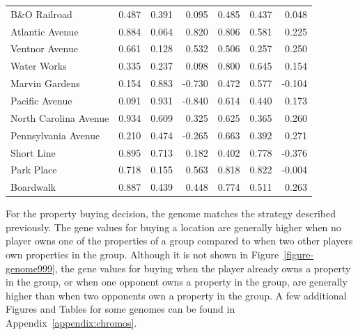 \begin{table}[htbp]
{\begin{tabular}{lrrr|rrr}
    B\&O Railroad & 0.487  & 0.391  & 0.095  & 0.485  & 0.437  & 0.048 \\
    Atlantic Avenue & 0.884  & 0.064  & 0.820  & 0.806  & 0.581  & 0.225 \\
    Ventnor Avenue & 0.661  & 0.128  & 0.532  & 0.506  & 0.257  & 0.250 \\
    Water Works & 0.335  & 0.237  & 0.098  & 0.800  & 0.645  & 0.154 \\
    Marvin Gardens & 0.154  & 0.883  & -0.730 & 0.472  & 0.577  & -0.104 \\
    Pacific Avenue & 0.091  & 0.931  & -0.840 & 0.614  & 0.440  & 0.173 \\
    North Carolina Avenue & 0.934  & 0.609  & 0.325  & 0.625  & 0.365  & 0.260 \\
    Pennsylvania Avenue & 0.210  & 0.474  & -0.265 & 0.663  & 0.392  & 0.271 \\
    Short Line & 0.895  & 0.713  & 0.182  & 0.402  & 0.778  & -0.376 \\
    Park Place & 0.718  & 0.155  & 0.563  & 0.818  & 0.822  & -0.004 \\
    Boardwalk & 0.887  & 0.439  & 0.448  & 0.774  & 0.511  & 0.263 \\
    \bottomrule
    \end{tabular}}
  \label{tab:chromo_compare}%
\end{table}%

For the property buying decision, the genome matches the strategy described
previously. The gene values for buying a location are generally higher when no
player owns one of the properties of a group compared to when two other players
own properties in the group. Although it is not shown in
Figure~\ref{figure-genome999}, the gene values for buying when the player
already owns a property in the group, or when one opponent owns a property in
the group, are generally higher than when two opponents own a property in the
group. A few additional Figures and Tables for some genomes can be found in
Appendix~\ref{appendix:chromos}.


